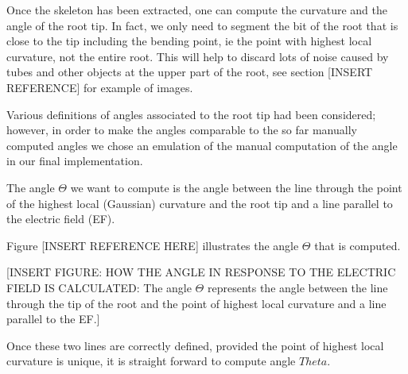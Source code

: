Once the skeleton has been extracted, one can compute the curvature and the angle of the root tip. 
In fact, we only need to segment the bit of the root that is close to the tip including the bending point, ie the point with highest local curvature, not the entire root. This will help to discard lots of noise caused by tubes and other objects at the upper part of the root, see section [INSERT REFERENCE] for example of images.

Various definitions of angles associated to the root tip had been considered; however, in order to make the angles comparable to the so far manually computed angles we chose an emulation of the manual computation of the angle in our final implementation. 



The angle \( \Theta \) we want to compute is the angle between the line through the point of the highest local (Gaussian) curvature and the root tip and a line parallel to the electric field (EF).  

Figure [INSERT REFERENCE HERE] illustrates the angle \( \Theta \) that is computed. 

[INSERT FIGURE: HOW THE ANGLE IN RESPONSE TO THE ELECTRIC FIELD IS CALCULATED: The angle \( \Theta \) represents the angle between the line through the tip of the root and the point of highest local curvature and a line parallel to the EF.]


Once these two lines are correctly defined, provided the point of highest local curvature is unique, it is straight forward to compute angle \( Theta \).


%
%


